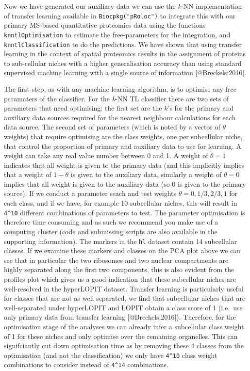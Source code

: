 Now we have generated our auxiliary data we can use the \emph{k}-NN
implementation of transfer learning available in
\texttt{Biocpkg("pRoloc")} to integrate this with our primary MS-based
quantitative proteomics data using the functions
\texttt{knntlOptimisation} to estimate the free-parameters for the
integration, and \texttt{knntlClassification} to do the predictions. We
have shown that using transfer learning in the context of spatial
proteomics results in the assignment of proteins to sub-cellular niches
with a higher generalisation accuracy than using standard supervised
machine learning with a single source of information
{[}@Breckels:2016{]}.

The first step, as with any machine learning algorithm, is to optimise
any free paramaters of the classifier. For the \emph{k}-NN TL classifier
there are two sets of parameters that need optimising: the first set are
the $k$'s for the primary and auxiliary data sources required for the
nearest neighbour calculations for each data source. The second set of
parameters (which is noted by a vector of $\theta$ weights) that require
optimising are the class weights, one per subcellular niche, that
control the proportion of primary and auxiliary data to use for
learning. A weight can take any real value number between 0 and 1. A
weight of $\theta = 1$ indicates that all weight is given to the primary
data (and this implicitly implies that a weight of $1 - \theta$ is given
to the auxiliary data, similarly a weight of $\theta = 0$ implies that
all weight is given to the auxiliary data (so 0 is given to the primary
source). If we conduct a parameter seach and test weights
$\theta = {0, 1/3, 2/3, 1}$ for each class, and if we have, for example
10 subcellular niches, this will result in \texttt{4\^{}10} different
combinations of parameters to test. The parameter optimisation is
therefore time consuming and as such we recommend you make use of a
computing cluster (code and submissing scripts are also available in the
supporting information). The markers in the \texttt{hl} dataset contain
14 subcellular classes. If we examine these markers and classes on the
PCA plot above we can see that in particular the two ribosomes and two
nuclear compartments are highly separated along the first two
components, this is also evident from the profiles plot which gives us a
good indication that these subcellular niches are well-resolved in the
hyperLOPIT dataset. Transfer learning is particularly useful for classes
that are not as well separated, we find that subcellular niches that are
well-separated under hyperLOPIT and LOPIT obtain a class score of 1
(i.e.~use only primary data from transfer learning
{[}@Breckels:2016{]}). Therefore, for the optimisation stage of the
analyses we can already infer a subcellular class weight of 1 for these
niches and only optimise over the remaining organelles. This can
signifciantly cut down optimisation time as by removing these 4 classes
from the optimisation (and not the classification) we only have
\texttt{4\^{}10} class weight combinations to consider instead of
\texttt{4\^{}14} combinations.

